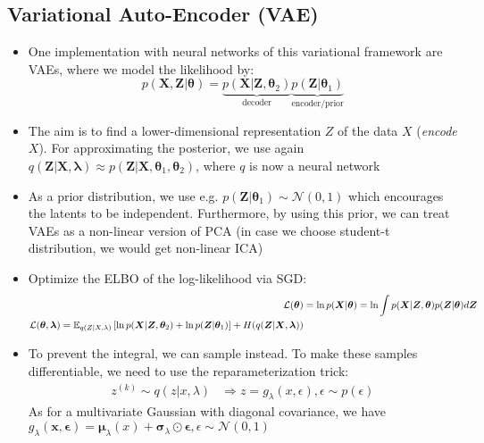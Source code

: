 \subsection{Variational Auto-Encoder (VAE)}
\begin{itemize}
	\item One implementation with neural networks of this variational framework are VAEs, where we model the likelihood by:
	$$p(\bm{X}, \bm{Z}|\bm{\theta}) = \underbrace{p(\bm{X}|\bm{Z}, \bm{\theta}_2)}_{\text{decoder}}\underbrace{p(\bm{Z}|\bm{\theta}_1)}_{\text{encoder/prior}}$$
	\item The aim is to find a lower-dimensional representation $Z$ of the data $X$ (\textit{encode} $X$). For approximating the posterior, we use again $q(\bm{Z}|\bm{X},\bm{\lambda})\approx p(\bm{Z}|\bm{X}, \bm{\theta}_1, \bm{\theta}_2)$, where $q$ is now a neural network
	\item As a prior distribution, we use e.g. $p(\bm{Z}|\bm{\theta}_1) \sim \mathcal{N}(0,1)$ which encourages the latents to be independent. Furthermore, by using this prior, we can treat VAEs as a non-linear version of PCA (in case we choose student-t distribution, we would get non-linear ICA)
	\item Optimize the ELBO of the log-likelihood via SGD:
	\begin{equation*}
		\begin{split}
			\mathcal{L}(\bm{\theta}) & = \ln p(\bm{X}|\bm{\theta}) = \ln \int p(\bm{X}|\bm{Z},\bm{\theta})p(\bm{Z}|\bm{\theta})d\bm{Z}\\
			\mathcal{L}(\bm{\theta}, \bm{\lambda}) = \mathbb{E}_{q(Z|X,\lambda)}\left[\ln p(\bm{X}|\bm{Z},\bm{\theta}_2) + \ln p(\bm{Z}|\bm{\theta}_1)\right] + H(q(\bm{Z}|\bm{X}, \bm{\lambda}))
		\end{split}
	\end{equation*}
	\item To prevent the integral, we can sample instead. To make these samples differentiable, we need to use the reparameterization trick:
	\begin{equation*}
		\begin{split}
			z^{(k)}\sim q(z|x, \lambda) & \Rightarrow z=g_{\lambda}(x, \epsilon), \epsilon\sim p(\epsilon)
		\end{split}
	\end{equation*}
	As for a multivariate Gaussian with diagonal covariance, we have $g_{\lambda}(\bm{x}, \bm{\epsilon})=\bm{\mu}_{\lambda}(x)+\bm{\sigma}_{\lambda}\odot \bm{\epsilon}, \epsilon\sim\mathcal{N}(0,1)$
\end{itemize}